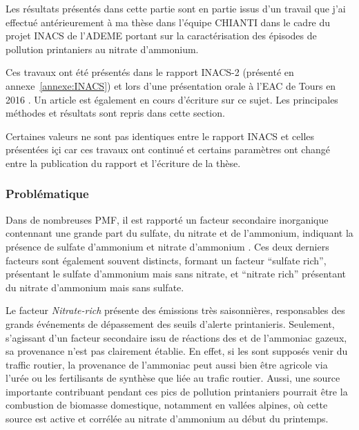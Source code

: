 \begin{tcolorbox}[colback=red!5!white,colframe=Melon,title=Note]
Les résultats présentés dans cette partie sont en partie issus d'un travail que j'ai
effectué antérieurement à ma
thèse dans l'équipe CHIANTI dans le cadre du projet INACS de l'ADEME portant sur
la caractérisation des épisodes de pollution printaniers au nitrate d'ammonium.
\end{tcolorbox}

\begin{tcolorbox}[colback=red!5!white,colframe=ProcessBlue,title=Note]
    Ces travaux ont été présentés dans le rapport INACS-2 (présenté en
    annexe~\ref{annexe:INACS}) et lors d'une présentation orale à l'EAC de Tours en 2016
    \autocite{weberNitrogen5}.
    Un article est également en cours d'écriture sur ce sujet.  Les principales méthodes
    et résultats sont repris dans cette section.

    Certaines valeurs ne sont pas identiques entre le rapport INACS et celles présentées içi
    car ces travaux ont continué et certains paramètres ont changé entre la publication
    du rapport et l'écriture de la thèse.
\end{tcolorbox}


\subsubsection{Problématique}%
\label{ssub:problématique}

Dans de nombreuses PMF, il est rapporté un facteur secondaire inorganique contennant une
grande part du sulfate, du nitrate et de l'ammonium, indiquant la présence de sulfate
d'ammonium  et nitrate d'ammonium . Ces deux derniers facteurs sont
également souvent distincts, formant un facteur ``sulfate rich'', présentant le sulfate
d'ammonium mais sans nitrate, et ``nitrate rich'' présentant du nitrate d'ammonium mais
sans sulfate.

Le facteur \textit{Nitrate-rich} présente des émissions très saisonnières, responsables
des grands événements de dépassement des seuils d'alerte printanieris. Seulement,
s'agissant d'un facteur secondaire issu de réactions des  et de l'ammoniac
 gazeux, sa provenance n'est pas clairement établie. En effet, si les 
sont supposés venir du traffic routier, la provenance de l'ammoniac peut aussi bien être
agricole via l'urée ou les fertilisants de synthèse que liée au trafic routier. Aussi, une
source importante contribuant pendant ces pics de pollution printaniers pourrait être la
combustion de biomasse domestique, notamment en vallées alpines, où cette source est
active et corrélée au nitrate d'ammonium au début du printemps.

